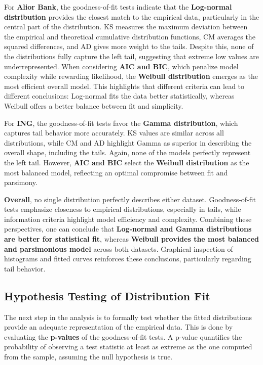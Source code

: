 \documentclass[
]{article}
\begin{document}
For \textbf{Alior Bank}, the goodness-of-fit tests indicate that the
\textbf{Log-normal distribution} provides the closest match to the
empirical data, particularly in the central part of the distribution. KS
measures the maximum deviation between the empirical and theoretical
cumulative distribution functions, CM averages the squared differences,
and AD gives more weight to the tails. Despite this, none of the
distributions fully capture the left tail, suggesting that extreme low
values are underrepresented. When considering \textbf{AIC and BIC},
which penalize model complexity while rewarding likelihood, the
\textbf{Weibull distribution} emerges as the most efficient overall
model. This highlights that different criteria can lead to different
conclusions: Log-normal fits the data better statistically, whereas
Weibull offers a better balance between fit and simplicity.

For \textbf{ING}, the goodness-of-fit tests favor the \textbf{Gamma
distribution}, which captures tail behavior more accurately. KS values
are similar across all distributions, while CM and AD highlight Gamma as
superior in describing the overall shape, including the tails. Again,
none of the models perfectly represent the left tail. However,
\textbf{AIC and BIC} select the \textbf{Weibull distribution} as the
most balanced model, reflecting an optimal compromise between fit and
parsimony.

\textbf{Overall}, no single distribution perfectly describes either
dataset. Goodness-of-fit tests emphasize closeness to empirical
distributions, especially in tails, while information criteria highlight
model efficiency and complexity. Combining these perspectives, one can
conclude that \textbf{Log-normal and Gamma distributions are better for
statistical fit}, whereas \textbf{Weibull provides the most balanced and
parsimonious model} across both datasets. Graphical inspection of
histograms and fitted curves reinforces these conclusions, particularly
regarding tail behavior.

\subsection{Hypothesis Testing of Distribution
Fit}\label{hypothesis-testing-of-distribution-fit}

The next step in the analysis is to formally test whether the fitted
distributions provide an adequate representation of the empirical data.
This is done by evaluating the \textbf{p-values} of the goodness-of-fit
tests. A p-value quantifies the probability of observing a test
statistic at least as extreme as the one computed from the sample,
assuming the null hypothesis is true.
\end{document}
